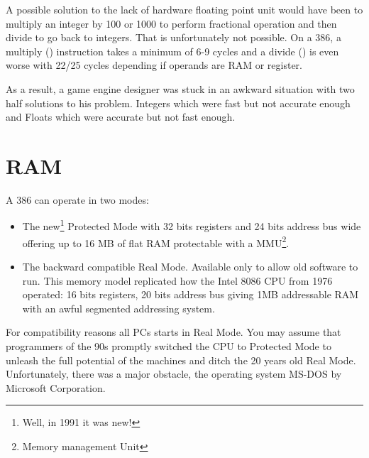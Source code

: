 \documentclass[book.tex]{subfiles}
\begin{document}
\par
A possible solution to the lack of hardware floating point unit would have been to multiply an integer by 100 or 1000 to perform fractional operation and then divide to go back to integers. That is unfortunately not possible. On a 386, a multiply () instruction takes a minimum of 6-9 cycles and a divide () is even worse with 22/25 cycles depending if operands are RAM or register.\\ 
\par
As a result, a game engine designer was stuck in an awkward situation with two half solutions to his problem. Integers which were fast but not accurate enough and Floats which were accurate but not fast enough.\\
\par
  















\section{RAM}
A 386 can operate in two modes:\\
\par
\begin{itemize}
  \item The new\footnote{Well, in 1991 it was new!} Protected Mode with  32 bits registers and 24 bits address bus wide offering up to 16 MB of flat RAM protectable with a MMU\footnote{Memory management Unit}.
  \item The backward compatible Real Mode. Available only to allow old software to run. This memory model replicated how the Intel 8086 CPU from 1976 operated: 16 bits registers, 20 bits address bus giving 1MB addressable RAM with an awful segmented addressing system. 
\end{itemize}
For compatibility reasons all PCs starts in Real Mode. You may assume that programmers of the 90s promptly switched the CPU to Protected Mode to unleash the full potential of the machines and ditch the 20 years old Real Mode. Unfortunately, there was a major obstacle, the operating system MS-DOS by Microsoft Corporation.
  
\end{document}
